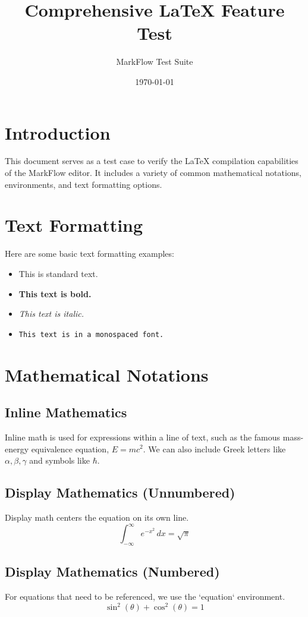 \documentclass{article}
\title{Comprehensive LaTeX Feature Test}
\author{MarkFlow Test Suite}
\date{\today}
\begin{document}
\maketitle

\section{Introduction}
This document serves as a test case to verify the LaTeX compilation capabilities of the MarkFlow editor. It includes a variety of common mathematical notations, environments, and text formatting options.

\section{Text Formatting}
Here are some basic text formatting examples:
\begin{itemize}
    \item This is standard text.
    \item \textbf{This text is bold.}
    \item \textit{This text is italic.}
    \item \texttt{This text is in a monospaced font.}
\end{itemize}

\section{Mathematical Notations}

\subsection{Inline Mathematics}
Inline math is used for expressions within a line of text, such as the famous mass-energy equivalence equation, $E = mc^2$. We can also include Greek letters like $\alpha, \beta, \gamma$ and symbols like $\hbar$.

\subsection{Display Mathematics (Unnumbered)}
Display math centers the equation on its own line.
\[
\int_{-\infty}^{\infty} e^{-x^2} \,dx = \sqrt{\pi}
\]

\subsection{Display Mathematics (Numbered)}
For equations that need to be referenced, we use the `equation` environment.
\begin{equation}
    \sin^2(\theta) + \cos^2(\theta) = 1
\end{equation}
\end{document}
